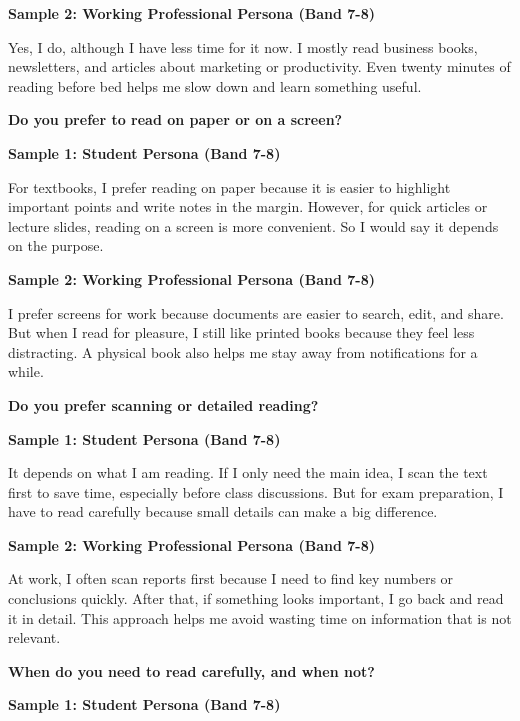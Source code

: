 \textbf{Sample 2: Working Professional Persona (Band 7-8)}

Yes, I do, although I have less time for it now. I mostly read business books, newsletters, and articles about marketing or productivity. Even twenty minutes of reading before bed helps me slow down and learn something useful.

\separator

\begin{ieltsquestion}
\textbf{Do you prefer to read on paper or on a screen?}
\end{ieltsquestion}
\textbf{Sample 1: Student Persona (Band 7-8)}

For textbooks, I prefer reading on paper because it is easier to highlight important points and write notes in the margin. However, for quick articles or lecture slides, reading on a screen is more convenient. So I would say it depends on the purpose.

\textbf{Sample 2: Working Professional Persona (Band 7-8)}

I prefer screens for work because documents are easier to search, edit, and share. But when I read for pleasure, I still like printed books because they feel less distracting. A physical book also helps me stay away from notifications for a while.

\separator

\begin{ieltsquestion}
\textbf{Do you prefer scanning or detailed reading?}
\end{ieltsquestion}
\textbf{Sample 1: Student Persona (Band 7-8)}

It depends on what I am reading. If I only need the main idea, I scan the text first to save time, especially before class discussions. But for exam preparation, I have to read carefully because small details can make a big difference.

\textbf{Sample 2: Working Professional Persona (Band 7-8)}

At work, I often scan reports first because I need to find key numbers or conclusions quickly. After that, if something looks important, I go back and read it in detail. This approach helps me avoid wasting time on information that is not relevant.

\separator

\begin{ieltsquestion}
\textbf{When do you need to read carefully, and when not?}
\end{ieltsquestion}
\textbf{Sample 1: Student Persona (Band 7-8)}

